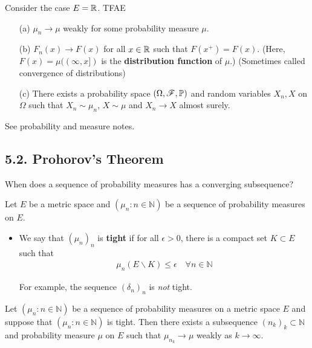 \documentclass[12pt,a4paper]{report}
\newenvironment{proof}
{\begin{changemargin}{1cm}{0.5cm} 
	}%
	{\end{changemargin}
}
\begin{document}
 Consider the case $E =\mathbb{R}$. TFAE
\begin{itemize}
\item[(a)] $\mu_n \rightarrow \mu$ weakly for some probability measure $\mu$.
\item[(b)] $F_n(x) \rightarrow F(x)$ for all $x\in \mathbb{R}$ such that $F(x^+) = F(x)$. (Here, $F(x)  = \mu((\infty,x])$ is the \textbf{distribution function} of $\mu$.) (Sometimes called convergence of distributions)
\item[(c)] There exists a probability space $(\Omega,\mathscr{F}, \mathbb{P})$ and random variables $X_n, X$ on $\Omega$ such that $X_n \sim \mu_n$, $X\sim \mu$ and $X_n \rightarrow X$ almost surely.
\end{itemize}
\begin{proof}
\pf See probability and measure notes.
\end{proof}
\s

\subsection*{5.2. Prohorov's Theorem}

When does a sequence of probability measures has a converging subsequence?
\s

Let $E$ be a metric space and $(\mu_n : n\in \mathbb{N})$ be a sequence of probability measures on $E$.
\begin{itemize}
\item We say that $(\mu_n)_n$ is \textbf{tight} if for all $\epsilon >0$, there is a compact set $K \subset E$ such that
\begin{align*}
\mu_n (E \backslash K) \leq \epsilon \quad \forall n\in \mathbb{N}
\end{align*}
\s

For example, the sequence $(\delta_n)_n$ is \emph{not} tight.
\end{itemize}
\s

 Let $(\mu_n : n\in \mathbb{N})$ be a sequence of probability measures on a metric space $E$ and suppose that $(\mu_n : n\in \mathbb{N})$ is tight. Then there exists a subsequence $(n_k)_k \subset \mathbb{N}$ and probability measure $\mu$ on $E$ such that $\mu_{n_k} \rightarrow \mu$ weakly as $k\rightarrow \infty$.
\s
\end{document}
